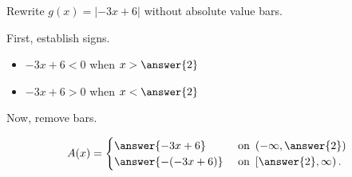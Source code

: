 \documentclass{ximera}
\author{Lee Wayand}
\begin{document}
\begin{example}











Rewrite $g(x) = | -3x + 6 |$ without absolute value bars.



\begin{explanation}


First, establish signs.

\begin{itemize}
\item $-3x + 6 < 0$ when $x > \answer{2}$
\item $-3x + 6 > 0$ when $x < \answer{2}$
\end{itemize}





Now, remove bars.

\[
A(x) = 
\begin{cases}
  \answer{-3x + 6} & \text{ on } \left( -\infty, \answer{2} \right)   \\
  \answer{-(-3x + 6)}  & \text{ on } \left[ \answer{2}, \infty \right).
\end{cases}
\]






\end{explanation}






\end{example}
\end{document}
